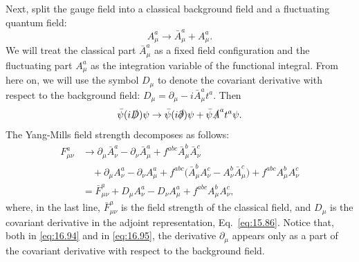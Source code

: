 Next, split the gauge field into a classical background field and a
fluctuating quantum field:
\begin{equation}
  A^a_\mu \to \bar{A}^a_\mu + A^a_\mu .
  \label{eq:16.93}
\end{equation}
We will treat the classical part $\bar{A}^a_\mu$ as a fixed field
configuration and the fluctuating part $A^a_\mu$ as the integration variable
of the functional integral.  From here on, we will use the symbol $D_\mu$ to
denote the covariant derivative with respect to the background field:
$D_\mu = \partial_\mu - i\bar{A}^a_\mu t^a$.  Then
\begin{equation}
  \bar{\psi}(i\slashed{D})\psi \to \bar{\psi}(i\slashed{\partial})\psi
    + \bar{\psi}\slashed{A}^a t^a\psi .
  \label{eq:16.94}
\end{equation}
The Yang-Mills field strength decomposes as follows:
\begin{equation}
  \begin{aligned}
    F^a_{\mu\nu} &\to \partial_\mu\bar{A}^a_\nu - \partial_\nu\bar{A}^a_\mu
      + f^{abc}\bar{A}^b_\mu\bar{A}^c_\nu\\
    &\quad + \partial_\mu A^a_\nu - \partial_\nu A^a_\mu + f^{abc}\bigl(
      \bar{A}^b_\mu A^c_\nu - A^b_\nu\bar{A}^c_\mu \bigr) + f^{abc}A^b_\mu A^c_\nu\\
    &= \bar{F}^a_{\mu\nu} + D_\mu A^a_\nu - D_\nu A^a_\mu + f^{abc}A^b_\mu
      A^c_\nu ,
  \end{aligned}
  \label{eq:16.95}
\end{equation}
where, in the last line, $\bar{F}^a_{\mu\nu}$ is the field strength of the
classical field, and $D_\mu$ is the covariant derivative in the adjoint
representation, Eq.~\eqref{eq:15.86}.  Notice that, both in \eqref{eq:16.94}
and in \eqref{eq:16.95}, the derivative $\partial_\mu$ appears only as a part
of the covariant derivative with respect to the background field.

